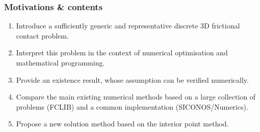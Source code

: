 \documentclass[8pt,red]{beamer}
\renewcommand{\tr}[1]{\textcolor{red}{#1}}
\begin{document}


  

\begin{frame}
  \frametitle{Motivations \&  contents}

  \begin{enumerate}
  \item Introduce a sufficiently generic and representative discrete 3D frictional contact problem.
  \item Interpret this problem in the context of numerical optimisation and mathematical programming.
  \item Provide an existence result, whose assumption can be verified numerically.
  \item Compare the main existing numerical methods based on a large collection of problems (FCLIB) and a common implementation (SICONOS/Numerics).
  \item Propose a new solution method based on the interior point method.
  \end{enumerate}
  \addtocounter{page}{-2}
\end{frame}
\end{document}

